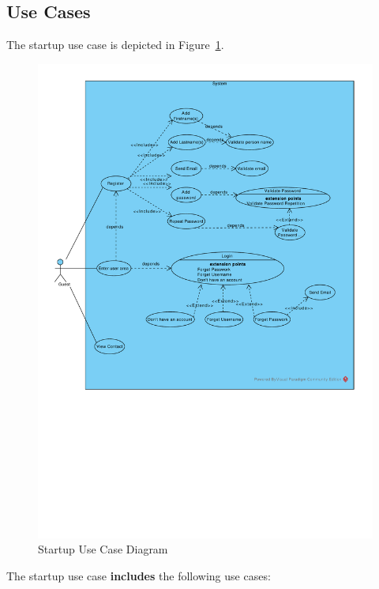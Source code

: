\subsection{Use Cases}
\label{sec:guest-use-cases}
The startup use case is depicted in Figure~\ref{fig:startup-use-case}.
\begin{figure}[htpb]
  \includegraphics[scale=0.55]{figures/startup-use-case.pdf}
  \caption{Startup Use Case Diagram}
  \label{fig:startup-use-case}
\end{figure}
%
The startup use case \textbf{includes} the following use cases:
%

